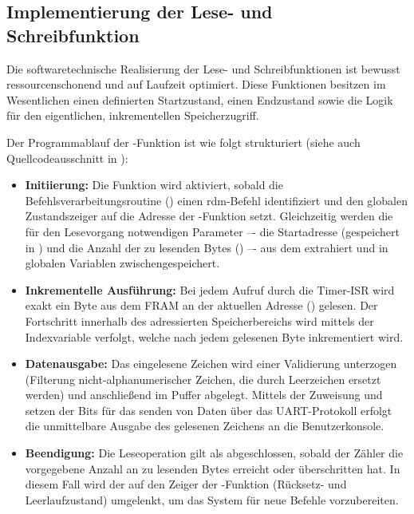 
\newpage
\subsection{Implementierung der Lese- und Schreibfunktion}
\label{sec:Implementierung_Lesen_Schreiben}

Die softwaretechnische Realisierung der Lese- und Schreibfunktionen ist bewusst ressourcenschonend und auf Laufzeit optimiert. Diese Funktionen besitzen im Wesentlichen einen definierten Startzustand, einen Endzustand sowie die Logik f\"ur den eigentlichen, inkrementellen Speicherzugriff.

Der Programmablauf der -Funktion ist wie folgt strukturiert (siehe auch Quellcodeausschnitt in ):
\begin{itemize}
	\item \textbf{Initiierung:} Die Funktion wird aktiviert, sobald die Befehlsverarbeitungsroutine () einen \grqq rdm\grqq-Befehl identifiziert und den globalen Zustandszeiger  auf die Adresse der -Funktion setzt. Gleichzeitig werden die f\"ur den Lesevorgang notwendigen Parameter –- die Startadresse (gespeichert in ) und die Anzahl der zu lesenden Bytes () –- aus dem  extrahiert und in globalen Variablen zwischengespeichert.
	
	\item \textbf{Inkrementelle Ausf\"uhrung:} Bei jedem Aufruf durch die Timer-ISR wird exakt ein Byte aus dem FRAM an der aktuellen Adresse () gelesen. Der Fortschritt innerhalb des adressierten Speicherbereichs wird mittels der Indexvariable  verfolgt, welche nach jedem gelesenen Byte inkrementiert wird.
	
	\item \textbf{Datenausgabe:} Das eingelesene Zeichen wird einer Validierung unterzogen (Filterung nicht-alphanumerischer Zeichen, die durch Leerzeichen ersetzt werden) und anschlie{\ss}end im Puffer  abgelegt. Mittels der Zuweisung \grq{}\grq und setzen der Bits f\"ur das senden von Daten \"uber das UART-Protokoll erfolgt die unmittelbare Ausgabe des gelesenen Zeichens an die Benutzerkonsole.
	
	\item \textbf{Beendigung:} Die Leseoperation gilt als abgeschlossen, sobald der Z\"ahler  die vorgegebene Anzahl an zu lesenden Bytes erreicht oder \"uberschritten hat. In diesem Fall wird der  auf den Zeiger der -Funktion (R\"ucksetz- und Leerlaufzustand) umgelenkt, um das System f\"ur neue Befehle vorzubereiten.
\end{itemize}

